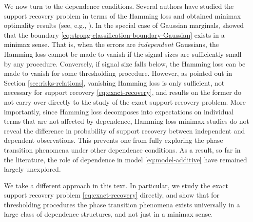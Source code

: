 We now turn to the dependence conditions.
Several authors have studied the support recovery problem in terms of the Hamming loss and obtained minimax optimality results (see, e.g., \cite{ji2012ups, genovese2012comparison, jin2014optimality, butucea2018variable}).
In the special case of Gaussian marginals, \cite{butucea2018variable} showed that the boundary \eqref{eq:strong-classification-boundary-Gaussian} exists in a minimax sense.
That is, when the errors are \emph{independent} Gaussians, the Hamming loss cannot be made to vanish if the signal sizes are sufficiently small by any procedure. 
Conversely, if signal size falls below, the Hamming loss can be made to vanish for some thresholding procedure.
%
However, as pointed out in Section \ref{sec:risks-relations}, vanishing Hamming loss is only sufficient, not necessary for support recovery \eqref{eq:exact-recovery}, and results on the former do not carry over directly to the study of the exact support recovery problem.
More importantly, since Hamming loss decomposes into expectations on individual terms that are not affected by dependence, Hamming loss-minimax studies do not reveal the difference in probability of support recovery between independent and dependent observations. 
This prevents one from fully exploring the phase transition phenomena under other dependence conditions.
As a result, so far in the literature, the role of dependence in model \eqref{eq:model-additive} have remained largely unexplored. 

We take a different approach in this text. 
In particular, we study the exact support recovery problem \eqref{eq:exact-recovery} directly, and show that for thresholding procedures the phase transition phenomena exists {universally} in a large class of dependence structures, and not just in a minimax sense.


